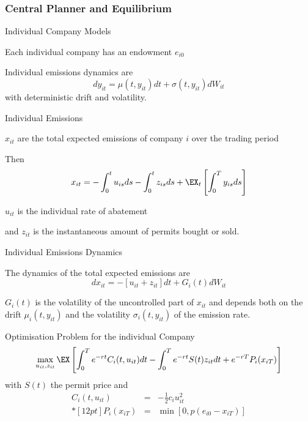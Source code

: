 \subsubsection{Central Planner and Equilibrium}

{Individual Company Models}


	Each individual company has an endowment $e_{i0}$

	Individual emissions dynamics are
\begin{equation}
dy_{it}= \mu(t, y_{it})dt + \sigma(t, y_{it})dW_{it}
\end{equation}
with deterministic drift and volatility.


{Individual Emissions}


	$x_{it}$ are the total expected emissions of company $i$ over the trading period

	Then
\begin{equation}
x_{it}=-\int_0^tu_{is} ds -\int_0^tz_{is}ds + \EX_t\left[\int_0^T y_{is} ds \right]
\end{equation}

	$u_{it}$ is the individual rate of abatement

	and $z_{it}$ is the instantaneous amount of permits bought or sold.


{Individual Emissions Dynamics}


	The dynamics of the total expected emissions are
\begin{equation}
dx_{it}=-[u_{it}+z_{it}] dt + G_i(t) dW_{it}
\end{equation}

	$G_i(t)$ is the volatility of the uncontrolled part of $x_{it}$ and depends both on the drift $\mu_i(t, y_{it})$
and the volatility $\sigma_i(t,y_{it})$ of the emission rate.


{Optimisation Problem for the individual Company}
\begin{equation}
\max_{u_{it}, z_{it}} \EX\left[\int_0^Te^{-rt}C_i(t,u_{it})dt - \int_0^T e^{-rt}S(t)z_{it}dt+ e^{-rT}P_i(x_{iT})\right]
\end{equation}
with $S(t)$ the permit price and
$$
\begin{array}{lll}
C_i(t,u_{it}) &=& - \frac{1}{2}c_i u_{it}^2 \\*[12pt]
P_i(x_{iT}) &=& \min[0,p(e_{i0}-x_{iT})]
\end{array}
$$

